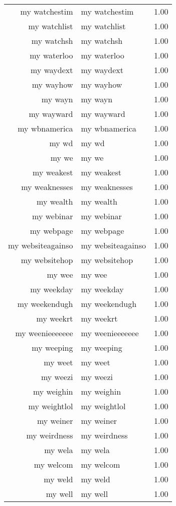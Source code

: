 \begin{table}[ht]
\begin{tabular}{rlr}
  my watchestim & my watchestim & 1.00 \\ 
  my watchlist & my watchlist & 1.00 \\ 
  my watchsh & my watchsh & 1.00 \\ 
  my waterloo & my waterloo & 1.00 \\ 
  my waydext & my waydext & 1.00 \\ 
  my wayhow & my wayhow & 1.00 \\ 
  my wayn & my wayn & 1.00 \\ 
  my wayward & my wayward & 1.00 \\ 
  my wbnamerica & my wbnamerica & 1.00 \\ 
  my wd & my wd & 1.00 \\ 
  my we & my we & 1.00 \\ 
  my weakest & my weakest & 1.00 \\ 
  my weaknesses & my weaknesses & 1.00 \\ 
  my wealth & my wealth & 1.00 \\ 
  my webinar & my webinar & 1.00 \\ 
  my webpage & my webpage & 1.00 \\ 
  my websiteagainso & my websiteagainso & 1.00 \\ 
  my websitehop & my websitehop & 1.00 \\ 
  my wee & my wee & 1.00 \\ 
  my weekday & my weekday & 1.00 \\ 
  my weekendugh & my weekendugh & 1.00 \\ 
  my weekrt & my weekrt & 1.00 \\ 
  my weenieeeeeee & my weenieeeeeee & 1.00 \\ 
  my weeping & my weeping & 1.00 \\ 
  my weet & my weet & 1.00 \\ 
  my weezi & my weezi & 1.00 \\ 
  my weighin & my weighin & 1.00 \\ 
  my weightlol & my weightlol & 1.00 \\ 
  my weiner & my weiner & 1.00 \\ 
  my weirdness & my weirdness & 1.00 \\ 
  my wela & my wela & 1.00 \\ 
  my welcom & my welcom & 1.00 \\ 
  my weld & my weld & 1.00 \\ 
  my well & my well & 1.00 \\ 

\end{tabular}
\end{table}
